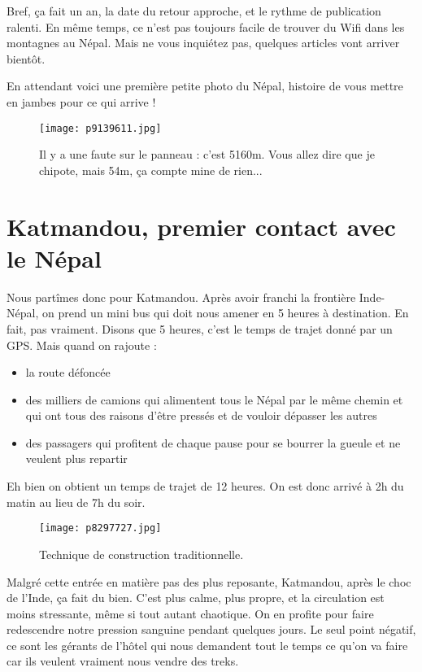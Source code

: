 \documentclass{book}
\begin{document}
Bref, ça fait un an, la date du retour approche, et le rythme de publication  ralenti. En même temps, ce n'est pas toujours facile de trouver du Wifi dans les montagnes au Népal. Mais ne vous inquiétez pas, quelques articles vont arriver bientôt.

En attendant voici une première petite photo du Népal, histoire de vous mettre en jambes pour ce qui arrive !


\begin{figure}[h]
\centering
\texttt{[image: p9139611.jpg]}
\caption*{Il y a une faute sur le panneau : c'est 5160m. Vous allez dire que je chipote, mais 54m, ça compte mine de rien...}
\end{figure}

\chapter{Katmandou, premier contact avec le Népal}
Nous partîmes donc pour Katmandou. Après avoir franchi la frontière Inde-Népal, on prend un mini bus qui doit nous amener en 5 heures à destination. En fait, pas vraiment. Disons que 5 heures, c'est le temps de trajet donné par un GPS. Mais quand on rajoute :
\begin{itemize}
	\item la route défoncée
	\item des milliers de camions qui alimentent tous le Népal par le même chemin et qui ont tous des raisons d'être pressés et de vouloir dépasser les autres
	\item des passagers qui profitent de chaque pause pour se bourrer la gueule et ne veulent plus repartir
\end{itemize}
Eh bien on obtient un temps de trajet  de 12 heures. On est donc arrivé à 2h du matin au lieu de 7h du soir.


\begin{figure}[h]
\centering
\texttt{[image: p8297727.jpg]}
\caption*{Technique de construction traditionnelle.}
\end{figure}

Malgré cette entrée en matière pas des plus reposante, Katmandou, après le choc de l'Inde, ça fait du bien. C'est plus calme, plus propre, et la circulation est moins stressante, même si tout autant chaotique. On en profite pour faire redescendre notre pression sanguine pendant quelques jours. Le seul point négatif, ce sont les gérants de l'hôtel qui nous demandent tout le temps ce qu'on va faire car ils veulent vraiment nous vendre des treks.
\end{document}
